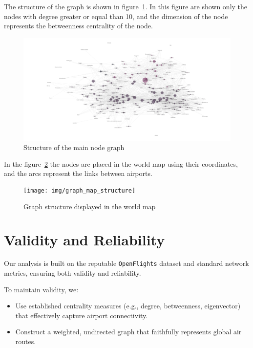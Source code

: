 \documentclass[12pt]{article}
\begin{document}
    The structure of the graph is shown in figure~\ref{fig:graph-structure}.
    In this figure are shown only the nodes with degree greater or equal than 10, and the dimension of the node represents the betweenness centrality of the node.
    \begin{figure}[H]
        \centering
        \includegraphics[width=1\linewidth]{img/graph_structure}
        \caption{Structure of the main node graph}
        \label{fig:graph-structure}
    \end{figure}

    In the figure~\ref{fig:world-graph} the nodes are placed in the world map using their coordinates, and the arcs represent the links between airports.

    \begin{figure}[H]
        \centering
        \texttt{[image: img/graph\_map\_structure]}
        \caption{Graph structure displayed in the world map}
        \label{fig:world-graph}
    \end{figure}


    \section{Validity and Reliability}\label{sec:validity-and-reliability}
    Our analysis is built on the reputable \texttt{OpenFlights} dataset and standard network metrics, ensuring both validity and reliability.

    To maintain validity, we:
    \begin{itemize}
        \item Use established centrality measures (e.g., degree, betweenness, eigenvector) that effectively capture airport connectivity.
        \item Construct a weighted, undirected graph that faithfully represents global air routes.
    \end{itemize}
\end{document}

